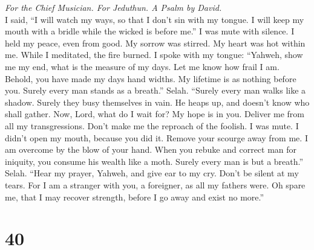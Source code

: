 \emph{For the Chief Musician. For Jeduthun. A Psalm by David.}\\
 I said, ``I will watch my ways, so that I don't sin with
my tongue. I will keep my mouth with a bridle while the wicked is before
me.''  I was mute with silence. I held my peace, even from
good. My sorrow was stirred.  My heart was hot within me.
While I meditated, the fire burned. I spoke with my tongue:
 ``Yahweh, show me my end, what is the measure of my days.
Let me know how frail I am.  Behold, you have made my days
hand widths. My lifetime is as nothing before you. Surely every man
stands as a breath.'' Selah.  ``Surely every man walks
like a shadow. Surely they busy themselves in vain. He heaps up, and
doesn't know who shall gather.  Now, Lord, what do I wait
for? My hope is in you.  Deliver me from all my
transgressions. Don't make me the reproach of the foolish.
 I was mute. I didn't open my mouth, because you did it.
 Remove your scourge away from me. I am overcome by the
blow of your hand.  When you rebuke and correct man for
iniquity, you consume his wealth like a moth. Surely every man is but a
breath.'' Selah.  ``Hear my prayer, Yahweh, and give ear
to my cry. Don't be silent at my tears. For I am a stranger with you, a
foreigner, as all my fathers were.  Oh spare me, that I
may recover strength, before I go away and exist no more.''

\hypertarget{section-39}{%
\section{40}\label{section-39}}

